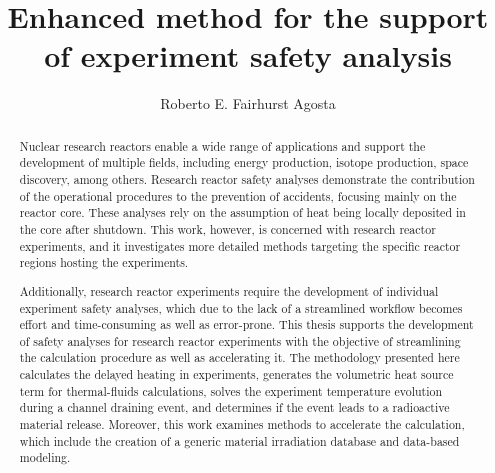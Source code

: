 \documentclass{uiucthesis2021}
\begin{document}
\title{Enhanced method for the support of experiment safety analysis}
\author{Roberto E. Fairhurst Agosta}
\phdthesis
{}
\maketitle

\frontmatter

\begin{abstract}

Nuclear research reactors enable a wide range of applications and support the development of multiple fields, including energy production, isotope production, space discovery, among others.
Research reactor safety analyses demonstrate the contribution of the operational procedures to the prevention of accidents, focusing mainly on the reactor core.
These analyses rely on the assumption of heat being locally deposited in the core after shutdown.
This work, however, is concerned with research reactor experiments, and it investigates more detailed methods targeting the specific reactor regions hosting the experiments.


Additionally, research reactor experiments require the development of individual experiment safety analyses, which due to the lack of a streamlined workflow becomes effort and time-consuming as well as error-prone.
This thesis supports the development of safety analyses for research reactor experiments with the objective of streamlining the calculation procedure as well as accelerating it.
The methodology presented here calculates the delayed heating in experiments, generates the volumetric heat source term for thermal-fluids calculations, solves the experiment temperature evolution during a channel draining event, and determines if the event leads to a radioactive material release.
Moreover, this work examines methods to accelerate the calculation, which include the creation of a generic material irradiation database and data-based modeling.


\end{abstract}
\end{document}
